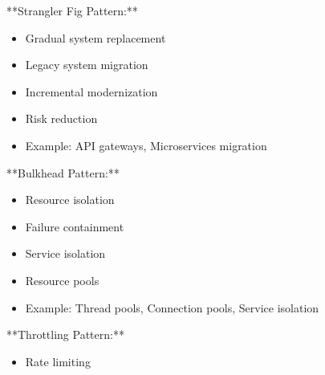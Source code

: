 \documentclass[11pt,a4paper]{article}
\begin{document}
**Strangler Fig Pattern:**

\begin{itemize}
\item Gradual system replacement
\end{itemize}

\begin{itemize}
\item Legacy system migration
\end{itemize}

\begin{itemize}
\item Incremental modernization
\end{itemize}

\begin{itemize}
\item Risk reduction
\end{itemize}

\begin{itemize}
\item Example: API gateways, Microservices migration
\end{itemize}

**Bulkhead Pattern:**

\begin{itemize}
\item Resource isolation
\end{itemize}

\begin{itemize}
\item Failure containment
\end{itemize}

\begin{itemize}
\item Service isolation
\end{itemize}

\begin{itemize}
\item Resource pools
\end{itemize}

\begin{itemize}
\item Example: Thread pools, Connection pools, Service isolation
\end{itemize}

**Throttling Pattern:**

\begin{itemize}
\item Rate limiting
\end{itemize}
\end{document}
